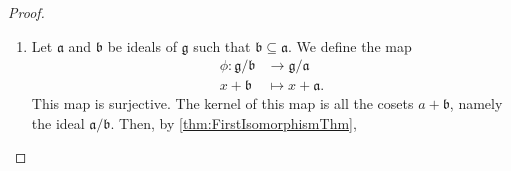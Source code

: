 \documentclass{article}
\DeclarePairedDelimiter\lb\lbrack\rbrack
\DeclareMathOperator{\im}{im}
\newcommand*\frka{{\ensuremath{\mathfrak{a}}}}
\newcommand*\frkb{{\ensuremath{\mathfrak{b}}}}
\newcommand*\frkg{{\ensuremath{\mathfrak{g}}}}
\newcommand*\frki{{\ensuremath{\mathfrak{i}}}}
\begin{document}
\begin{proof}
\begin{enumerate}[label=(\alph*)]
            Next, we check that it respects brackets:
            \begin{align*}
                \barphi
                \Big(
                    \lb{x+\ker\phi, y +\ker\phi}
                \Big)
                &=
                \barphi
                \Big(
                    \lb{xy} + \ker\phi
                \Big)
                \\
                &=
                \phi\Big(\lb{xy}\Big)
                \\
                &=
                \lb{\phi(x)\phi(y)}
                \\
                &=
                \lb{
                    \barphi\Big(x + \ker\phi\Big),
                    \barphi\Big(y + \ker\phi\Big)
                }.
            \end{align*}
            Then, it is a homomorphism.
            To show that it is an isomorphism, we note that it has a trival kernel, trivially:
            \[
                \ker\barphi
                =
                \{x + \ker \phi : x + \ker\phi = \ker \phi\}
                =
                \{0 + \ker \phi\}.
            \]
            Now, let $\frki$ be an ideal of $\frkg$ contained in $\ker \phi$.
            We define in a similar way
            \begin{align*}
                \barphi:
                \frkg/\frki
                &\to
                \im \phi
                \\
                x + \frki
                &\mapsto
                \phi(x),
            \end{align*}
            and via a similar argument as above, this map is well-defined. 
            It is moreover clear that $\barphi \circ \pi = \phi$ and that it is the only such homomorphism that has these properties.
        \item 
            Let $\frka$ and $\frkb$ be ideals of $\frkg$ such that $\frkb \subseteq \frka$.
            We define the map
            \begin{align*}
                \phi:
                \frkg/\frkb
                &\to
                \frkg/\frka
                \\
                x + \frkb
                &\mapsto
                x + \frka.
            \end{align*}
            This map is surjective.
            The kernel of this map is all the cosets $a + \frkb$, namely the ideal $\frka/\frkb$.
            Then, by \ref{thm:FirstIsomorphismThm}, 

\end{enumerate}
\end{proof}
\end{document}
